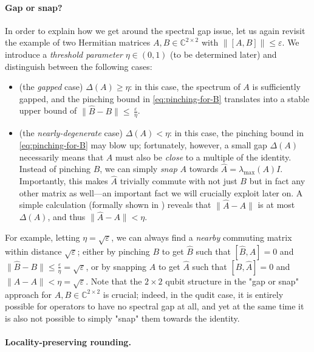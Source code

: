 \documentclass[a4paper,onecolumn,11pt]{quantumarticle}
\theoremstyle{plain}
\newcommand{\eps}{\varepsilon}
\begin{document}
\paragraph{Gap or snap?} In order to explain how we get around the spectral gap issue, let us again revisit the example of two Hermitian matrices $A,B \in \mathbb{C}^{2 \times 2}$ with $\|[A,B]\| \leq \eps$. We introduce a \emph{threshold parameter} $\eta \in (0,1)$ (to be determined later) and distinguish between the following cases:
\begin{itemize}
    \item (the \emph{gapped} case) $\Delta(A) \geq \eta$: in this case, the spectrum of $A$ is sufficiently gapped, and the pinching bound in \eqref{eq:pinching-for-B} translates into a stable upper bound of $\|\hat{B} - B\| \leq  \, \frac{\eps}{\eta}$.

    \item (the \emph{nearly-degenerate} case) $\Delta(A) < \eta$: in this case, the pinching bound in \eqref{eq:pinching-for-B} may blow up; fortunately, however, a small gap $\Delta(A)$ necessarily means that $A$ must also be \emph{close} to a multiple of the identity. Instead of pinching $B$, we can simply \emph{snap} $A$ towards $\hat{A} = \lambda_{\max}(A) I$. Importantly, this makes $\hat{A}$ trivially commute with not just $B$ but in fact any other matrix as well---an important fact we will crucially exploit later on.
    A simple calculation (formally shown in ) reveals that $\|\hat{A} - A\|$ is at most $\Delta(A)$, and thus $\|\hat{A} - A\| < \eta$.
\end{itemize}
For example, letting $\eta = \sqrt{\eps}$, we can always find a \emph{nearby} commuting matrix within distance $\sqrt{\eps}$; either by pinching $B$ to get $\hat B$ such that $[\hat{B},A]=0$ and $\|\hat{B} - B\| \leq \frac{\eps}{\eta} = \sqrt{\eps}$, or by snapping $A$ to get $\hat{A}$ such that $[B,\hat{A}]=0$ and $\|\hat{A} - A\| < \eta = \sqrt{\eps}$.
Note that the $2 \times 2$ qubit structure in the "gap or snap" approach for $A,B \in \mathbb{C}^{2 \times 2}$ is crucial; indeed, in the qudit case, it is entirely possible for operators to have no spectral gap at all, and yet at the same time it is also not possible to simply "snap" them towards the identity.


\paragraph{Locality-preserving rounding.} 
\end{document}
